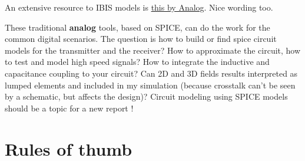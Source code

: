 \documentclass[final]{cubedoc}
\begin{document}
	An extensive resource to IBIS models is \href{https://www.analog.com/media/en/technical-documentation/application-notes/AN-715.pdf}{this by Analog}. Nice wording too.
	
	
	These traditional \textbf{analog} tools, based on SPICE, can do the work for the common digital scenarios. The question is how to build or find spice circuit models for the transmitter and the receiver? How to approximate the circuit, how to test and model high speed signals? How to integrate the inductive and capacitance coupling to your circuit? Can 2D and 3D fields results interpreted as lumped elements and included in my simulation (because crosstalk can't be seen by a schematic, but affects the design)? Circuit modeling using SPICE models should be a topic for a new report \cite{bogatin2009signal}!
	
	
	
	\section{Rules of thumb}
	\label{subsec:thumb}
	
\end{document}
